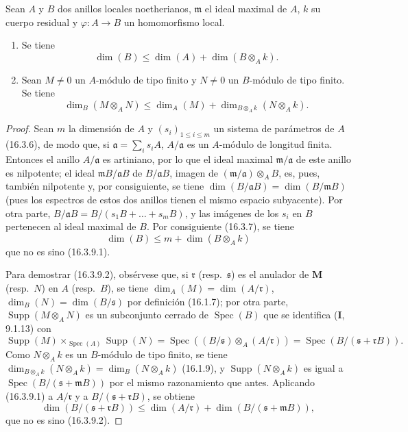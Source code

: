 \begin{proposition}[16.3.9]
\label{0.16.3.9-es}
Sean $A$ y $B$ dos anillos locales noetherianos, $\mathfrak{m}$ el ideal
maximal de $A$, $k$ su cuerpo residual y $\varphi:A\to B$ un homomorfismo
local.
\begin{enumerate}
  \item[\rm{(i)}] Se tiene
  \begin{equation}
  \label{0.16.3.9.1-es}
  \tag{16.3.9.1}
    \dim(B)\leq\dim(A)+\dim(B\otimes_A k).
  \end{equation}
  \item[\rm{(ii)}] Sean $M\neq0$ un $A$-módulo de tipo finito y $N\neq0$ un
  $B$-módulo de tipo finito. Se tiene
  \begin{equation}
  \label{0.16.3.9.2-es}
  \tag{16.3.9.2}
    \dim_B(M\otimes_A N)
    \leq\dim_A(M)+\dim_{B\otimes_A k}(N\otimes_A k).
  \end{equation}
\end{enumerate}
\end{proposition}

\begin{proof}
Sean $m$ la dimensión de $A$ y $(s_i)_{1\leq i\leq m}$ un sistema de
parámetros de $A$ (16.3.6), de modo que, si
$\mathfrak{a}=\sum_i s_iA$, $A/\mathfrak{a}$ es un $A$-módulo de longitud
finita. Entonces el anillo $A/\mathfrak{a}$ es artiniano, por lo que el ideal
maximal $\mathfrak{m}/\mathfrak{a}$ de este anillo es nilpotente; el ideal
$\mathfrak{m}B/\mathfrak{a}B$ de $B/\mathfrak{a}B$, imagen de
$(\mathfrak{m}/\mathfrak{a})\otimes_A B$, es, pues, también nilpotente y, por
consiguiente, se tiene
$\dim(B/\mathfrak{a}B)=\dim(B/\mathfrak{m}B)$ (pues los espectros de estos dos
anillos tienen el mismo espacio subyacente). Por otra parte,
$B/\mathfrak{a}B=B/(s_1B+\ldots+s_mB)$, y las imágenes de los $s_i$ en $B$
pertenecen al ideal maximal de $B$. Por consiguiente (16.3.7), se tiene
\[
  \dim(B)\leq m+\dim(B\otimes_A k)
\]
que no es sino (16.3.9.1).

Para demostrar (16.3.9.2), obsérvese que, si $\mathfrak{r}$
(resp.~$\mathfrak{s}$) es el anulador de $\mathbf M$ (resp.~$N$)
en $A$ (resp.~$B$), se tiene
$\dim_A(M)=\dim(A/\mathfrak{r})$, $\dim_B(N)=\dim(B/\mathfrak{s})$ por
definición (16.1.7); por otra parte, $\operatorname{Supp}(M\otimes_A N)$ es un
subconjunto cerrado de $\operatorname{Spec}(B)$ que se identifica (\textbf I, 9.1.13)
con
\[
  \operatorname{Supp}(M)\times_{\operatorname{Spec}(A)}\operatorname{Supp}(N)
  =\operatorname{Spec}((B/\mathfrak{s})\otimes_A(A/\mathfrak{r}))
  =\operatorname{Spec}(B/(\mathfrak{s}+\mathfrak{r}B)).
\]
Como $N\otimes_A k$ es un $B$-módulo de tipo finito, se tiene
$\dim_{B\otimes_A k}(N\otimes_A k)=\dim_B(N\otimes_A k)$ (16.1.9), y
$\operatorname{Supp}(N\otimes_A k)$ es igual a
$\operatorname{Spec}(B/(\mathfrak{s}+\mathfrak{m}B))$ por el mismo
razonamiento que antes. Aplicando (16.3.9.1) a $A/\mathfrak{r}$ y a
$B/(\mathfrak{s}+\mathfrak{r}B)$, se obtiene
\[
  \dim(B/(\mathfrak{s}+\mathfrak{r}B))
  \leq\dim(A/\mathfrak{r})+
  \dim(B/(\mathfrak{s}+\mathfrak{m}B)),
\]
que no es sino (16.3.9.2).
\end{proof}


